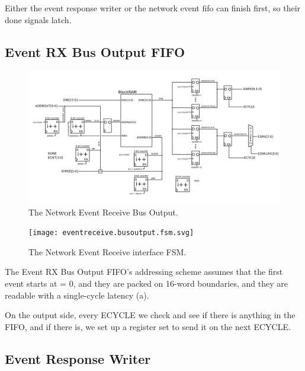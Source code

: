 Either the event response writer or the network event fifo can finish
first, so their done signals latch. 

\subsection{Event RX Bus Output FIFO}
\begin{figure}
\begin{centering}
\includegraphics[scale=0.8]{eventreceive.busoutput.svg}
\end{centering}
\caption{The Network Event Receive Bus Output.}
\label{eventreceive.busoutput}
\end{figure}

\begin{figure}
\begin{centering}
\texttt{[image: eventreceive.busoutput.fsm.svg]}
\end{centering}
\caption{The Network Event Receive interface FSM.}
\label{eventreceive.busoutput.fsm}
\end{figure}

The Event RX Bus Output FIFO's addressing scheme assumes that the
first event starts at  = 0, and they are packed
on 16-word boundaries, and they are readable with a single-cycle
latency (a).

On the output side, every ECYCLE we check and see if there is anything
in the FIFO, and if there is, we set up a register set to send it on
the next ECYCLE. 

\subsection{Event Response Writer}

